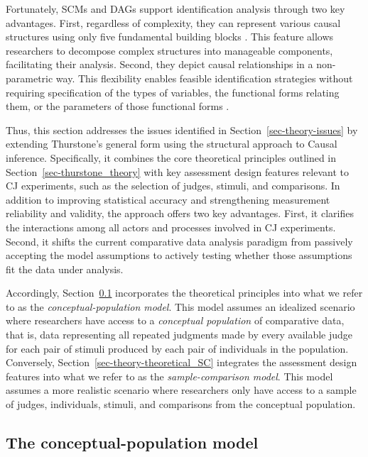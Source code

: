 \documentclass[
  authoryear,
  review,
  1p]{elsarticle}
\begin{document}
Fortunately, SCMs and DAGs support identification analysis through two
key advantages. First, regardless of complexity, they can represent
various causal structures using only five fundamental building blocks
\citep[see][]{Neal_2020, McElreath_2020}. This feature allows
researchers to decompose complex structures into manageable components,
facilitating their analysis. Second, they depict causal relationships in
a non-parametric way. This flexibility enables feasible identification
strategies without requiring specification of the types of variables,
the functional forms relating them, or the parameters of those
functional forms \citep[pp.~35]{Pearl_et_al_2016}.

Thus, this section addresses the issues identified in
Section~\ref{sec-theory-issues} by extending Thurstone's general form
using the structural approach to Causal inference. Specifically, it
combines the core theoretical principles outlined in
Section~\ref{sec-thurstone_theory} with key assessment design features
relevant to CJ experiments, such as the selection of judges, stimuli,
and comparisons. In addition to improving statistical accuracy and
strengthening measurement reliability and validity, the approach offers
two key advantages. First, it clarifies the interactions among all
actors and processes involved in CJ experiments. Second, it shifts the
current comparative data analysis paradigm from passively accepting the
model assumptions to actively testing whether those assumptions fit the
data under analysis.

Accordingly, Section~\ref{sec-theory-theoretical_P} incorporates the
theoretical principles into what we refer to as the
\emph{conceptual-population model}. This model assumes an idealized
scenario where researchers have access to a \emph{conceptual population}
of comparative data, that is, data representing all repeated judgments
made by every available judge for each pair of stimuli produced by each
pair of individuals in the population. Conversely,
Section~\ref{sec-theory-theoretical_SC} integrates the assessment design
features into what we refer to as the \emph{sample-comparison model}.
This model assumes a more realistic scenario where researchers only have
access to a sample of judges, individuals, stimuli, and comparisons from
the conceptual population.

\subsection{The conceptual-population
model}\label{sec-theory-theoretical_P}
\end{document}
